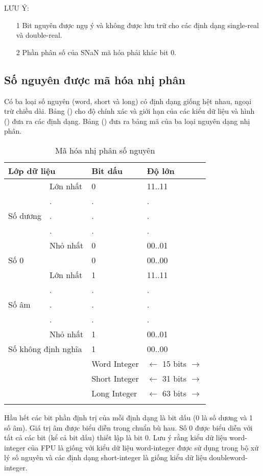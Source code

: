 	LƯU Ý:
	\begin{itemize}
		\item[1] Bit nguyên được ngụ ý và không được lưu trữ cho các định dạng single-real và double-real.
		 \item[2] Phần phân số của SNaN mã hóa phải khác bit 0.
	\end{itemize}

		\subsection*{ Số nguyên được mã hóa nhị phân}
	Có ba loại số nguyên (word, short và long) có định dạng giống hệt nhau, ngoại trừ chiều dài. Bảng () cho độ chính xác và giới hạn của các kiểu dữ liệu và hình () đưa ra các định dạng. Bảng () đưa ra bảng mã của ba loại nguyên dạng nhị phân.
		\begin{longtable}{|l|l|l|l|}
			\hline
				\multicolumn{2}{|l|}{Lớp dữ liệu} & Bit dấu & Độ lớn \\
			\hline
			\hline
					 & Lớn nhất & 0 & 11..11 \\				
					& . & . &. \\
					Số dương& . & . &. \\
					& . & . &. \\
					 & Nhỏ nhất & 0 & 00..01 \\				
			\hline
				\multicolumn{2}{|l|}{Số 0} & 0 &00..00 \\
			\hline
					 & Lớn nhất & 1 & 11..11 \\				
					& . & . &. \\
					Số âm & . & . &. \\
					& . & . &. \\
					 & Nhỏ nhất & 1 & 00..01 \\	
			\hline
				\multicolumn{2}{|l|}{Số không định nghĩa} & 1 &00..00 \\
			\hline
				\multicolumn{2}{l}{} & Word Integer & $\leftarrow$ 15 bits $\to $ \\
				\multicolumn{2}{l}{} & Short Integer & $\leftarrow$ 31 bits $\to $ \\
				\multicolumn{2}{l}{} & Long Integer & $\leftarrow$ 63 bits $\to $ \\
				\caption{Mã hóa nhị phân số nguyên}
				\label{tb:MaHoaSoNguye}
		\end{longtable}	

	Hầu hết các bit phần định trị của mỗi định dạng là bit dấu (0 là số dương và 1 số âm). Giá trị âm được biểu diễn trong chuẩn bù hau. Số 0 được biểu diễn với tất cả các bit (kể cả bit dấu) thiết lập là bit 0. Lưu ý rằng kiểu dữ liệu word-integer của FPU là giống với kiểu dữ liệu word-integer được sử dụng trong bộ xử lý số nguyên và các định dạng short-integer là giống kiểu dữ liệu doubleword-integer.\\
	
